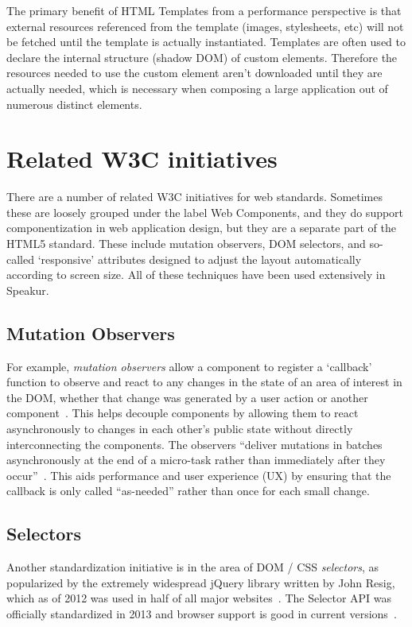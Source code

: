 The primary benefit of HTML Templates from a performance perspective is that external resources referenced from the template (images, stylesheets, etc) will not be fetched until the template is actually instantiated.
Templates are often used to declare the internal structure (shadow DOM) of custom elements. 
Therefore the resources needed to use the custom element aren't downloaded until they are actually needed, which is necessary when composing a large application out of numerous distinct elements.


\section{Related W3C initiatives}
There are a number of related W3C initiatives for web standards. 
Sometimes these are loosely grouped under the label Web Components,
and they do support componentization in web application design, 
but they are a separate part of the HTML5 standard.
These include mutation observers, 
DOM selectors, 
and so-called `responsive' attributes designed to adjust the layout automatically according to screen size.
All of these techniques have been used extensively in Speakur.

\subsection{Mutation Observers}
For example, \textit{mutation observers}
allow a component to register a `callback' function to observe and react to any changes in the state of an area of interest in the DOM, 
whether that change was generated by a user action or another 
component~\cite{w3ccontributors2014}.
This helps decouple components by allowing them to react asynchronously to changes in each other's public state without directly interconnecting the components.
The observers ``deliver mutations in batches asynchronously at the end of a micro-task rather than immediately after they occur''~\cite{addyosmani2014}.
This aids performance and user experience (UX) by ensuring that the callback is only called ``as-needed'' rather than once for each small change.

\subsection{Selectors}
Another standardization initiative is in the area of DOM / CSS \textit{selectors},
as popularized by the extremely widespread jQuery library
written by John Resig, 
which as of 2012 was used in half of all major websites~\cite{matthiasgelbmann2012}.
The Selector API was officially standardized in 2013 and browser support is good in current versions~\cite{w3ccontributors2013}.

